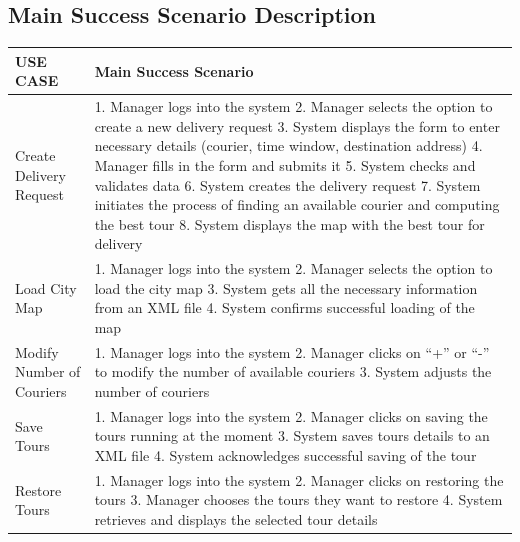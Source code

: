 \documentclass{article}
\begin{document}
\subsection{Main Success Scenario Description}
\begin{longtable}{|m{5cm}|m{10cm}|}
\hline
USE CASE & Main Success Scenario \\
\hline
Create Delivery Request & 
1. Manager logs into the system
2. Manager selects the option to create a new delivery request
3. System displays the form to enter necessary details (courier, time window, destination address)
4. Manager fills in the form and submits it
5. System checks and validates data
6. System creates the delivery request
7. System initiates the process of finding an available courier and computing the best tour 
8. System displays the map with the best tour for delivery \\
\hline
Load City Map & 1. Manager logs into the system 2. Manager selects the option to load the city map 3. System gets all the necessary information from an XML file 4. System confirms successful loading of the map \\
\hline
Modify Number of Couriers & 1. Manager logs into the system 2. Manager clicks on “+” or “-” to modify the number of available couriers 3. System adjusts the number of couriers \\
\hline
Save Tours & 1. Manager logs into the system 2. Manager clicks on saving the tours running at the moment 3. System saves tours details to an XML file 4. System acknowledges successful saving of the tour  \\
\hline
Restore Tours & 1. Manager logs into the system 2. Manager clicks on restoring the tours 3. Manager chooses the tours they want to restore 4. System retrieves and displays the selected tour details  \\
\hline
\end{longtable}
\end{document}
